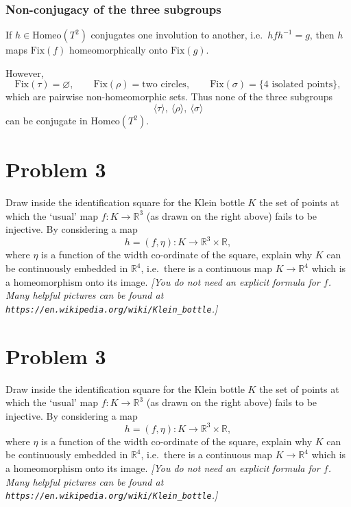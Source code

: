 \documentclass[12pt,a4paper]{article}
\theoremstyle{plain}
\theoremstyle{definition}      %
\begin{document}
\subsubsection*{Non-conjugacy of the three subgroups}

If \(h\in\mathrm{Homeo}(T^{2})\) conjugates one involution to another,
i.e.\ \(hfh^{-1}=g\), then \(h\) maps \(\mathrm{Fix}(f)\) homeomorphically
onto \(\mathrm{Fix}(g)\).

However,
\[
\mathrm{Fix}(\tau)=\varnothing,\qquad
\mathrm{Fix}(\rho)=\text{two circles},\qquad
\mathrm{Fix}(\sigma)=\{4\text{ isolated points}\},
\]
which are pairwise non-homeomorphic sets.  
Thus none of the three subgroups
\[
\langle\tau\rangle,\ \langle\rho\rangle,\ \langle\sigma\rangle
\]
can be conjugate in \(\mathrm{Homeo}(T^{2})\).

\section*{Problem 3}

Draw inside the identification square for the Klein bottle $K$ the set of points
at which the ‘usual’ map \( f : K \to \mathbb{R}^{3} \)
(as drawn on the right above) fails to be injective.
By considering a map
\[
h = (f,\eta) : K \longrightarrow \mathbb{R}^{3} \times \mathbb{R},
\]
where \(\eta\) is a function of the width co-ordinate of the square,
explain why \(K\) can be continuously embedded in \(\mathbb{R}^{4}\),
i.e.\ there is a continuous map \(K \to \mathbb{R}^{4}\) which is a homeomorphism
onto its image.
\emph{[You do not need an explicit formula for \(f\). Many helpful pictures
	can be found at \texttt{https://en.wikipedia.org/wiki/Klein\_bottle}.]}


\section*{Problem 3}

Draw inside the identification square for the Klein bottle $K$ the set of points
at which the ‘usual’ map $f : K \to \mathbb{R}^{3}$
(as drawn on the right above) fails to be injective.
By considering a map
\[
h = (f,\eta) : K \longrightarrow \mathbb{R}^{3} \times \mathbb{R},
\]
where $\eta$ is a function of the width co-ordinate of the square,
explain why $K$ can be continuously embedded in $\mathbb{R}^{4}$,
i.e.\ there is a continuous map $K \to \mathbb{R}^{4}$ which is a homeomorphism
onto its image.
\emph{[You do not need an explicit formula for $f$. Many helpful pictures
	can be found at \texttt{https://en.wikipedia.org/wiki/Klein\_bottle}.]}
\end{document}
